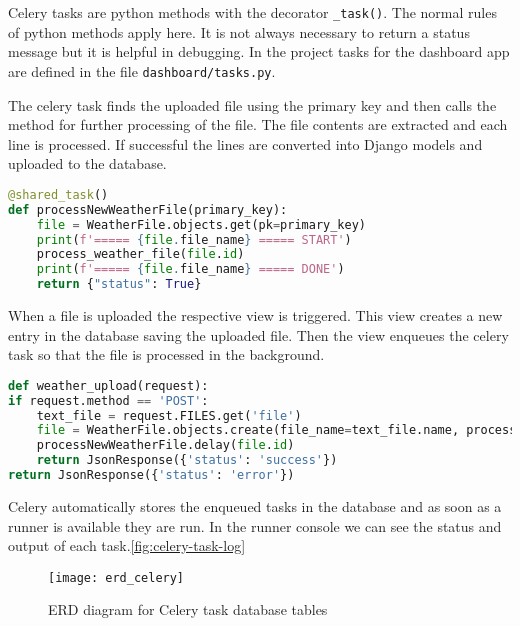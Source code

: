 Celery tasks are python methods with the decorator \texttt{\@shared\_task()}. The normal rules of python methods apply here. It is not always
necessary to return a status message but it is helpful in debugging. In the project
tasks for the dashboard app are defined in the file \texttt{dashboard/tasks.py}.

The celery task finds the uploaded file using the primary key and then calls the
method for further processing of the file. The file contents are extracted and
each line is processed. If successful the lines are converted into Django models
and uploaded to the database.

\begin{lstlisting}[language={Python}]
@shared_task()
def processNewWeatherFile(primary_key):
	file = WeatherFile.objects.get(pk=primary_key)
	print(f'===== {file.file_name} ===== START')
	process_weather_file(file.id)
	print(f'===== {file.file_name} ===== DONE')
	return {"status": True}
\end{lstlisting}

When a file is uploaded the respective view is triggered. This view creates a
new entry in the database saving the uploaded file. Then the view enqueues the 
celery task so that the file is processed in the background.

\begin{lstlisting}[language={Python}]
def weather_upload(request):
if request.method == 'POST':
	text_file = request.FILES.get('file')
	file = WeatherFile.objects.create(file_name=text_file.name, processing_status=False, upload=text_file)
	processNewWeatherFile.delay(file.id)
	return JsonResponse({'status': 'success'})
return JsonResponse({'status': 'error'})
\end{lstlisting}

Celery automatically stores the enqueued tasks in the database and as soon as a runner is available they are run.
In the runner console we can see the status and output of each task.\ref{fig:celery-task-log}

\begin{figure}[H]
	\centering
	\texttt{[image: erd\_celery]}
	\caption{ERD diagram for Celery task database tables}
	\label{fig:erd_celery}
\end{figure}


